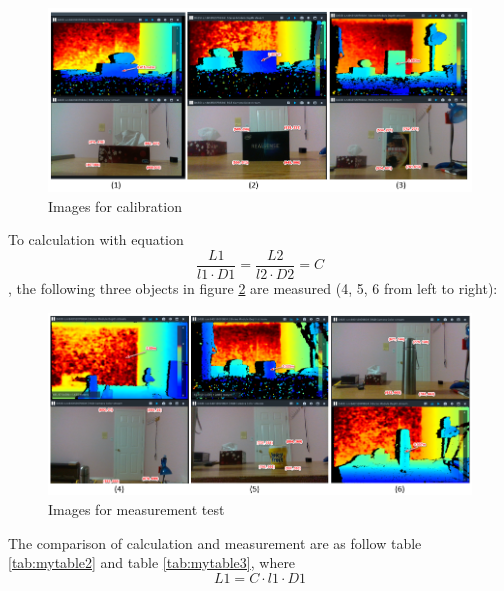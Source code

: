 \documentclass[
  oneside]{ubcthesis}
\begin{document}
\begin{figure}

{\centering \includegraphics[width=0.9\linewidth]{figures/6} 

}

\caption{Images for calibration}\label{fig:figure6}
\end{figure}



To calculation with equation \[\frac{L1}{l1 \cdot D1} = \frac{L2}{l2 \cdot D2} = C\], the following three objects in figure \ref{fig:figure7} are measured (4, 5, 6 from left to right):

\begin{figure}

{\centering \includegraphics[width=0.9\linewidth]{figures/7} 

}

\caption{Images for measurement test}\label{fig:figure7}
\end{figure}



The comparison of calculation and measurement are as follow table \ref{tab:mytable2} and table \ref{tab:mytable3}, where \[L1 = C \cdot l1 \cdot D1\]
\end{document}
